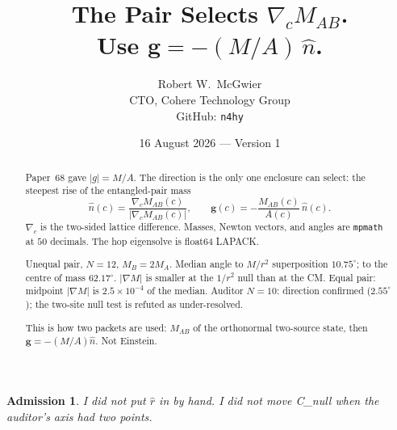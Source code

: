 \documentclass[11pt]{article}
\title{\textbf{The Pair Selects $\nabla_c M_{AB}$.\\
Use $\mathbf g=-(M/A)\,\hat n$.}}
\author{Robert W.\ McGwier\\
\small CTO, Cohere Technology Group\\
\small GitHub: \texttt{n4hy}}
\date{16 August 2026 --- Version 1}
\newtheorem*{admission}{Admission}
\begin{document}
\maketitle

\begin{abstract}
\noindent
Paper~68 gave $\lvert g\rvert=M/A$. The direction is
the only one enclosure can select: the steepest rise
of the entangled-pair mass
\[
\hat n(c)=\frac{\nabla_c M_{AB}(c)}{\lvert\nabla_c M_{AB}(c)\rvert},\qquad
\mathbf g(c)=-\frac{M_{AB}(c)}{A(c)}\,\hat n(c).
\]
$\nabla_c$ is the two-sided lattice difference.
Masses, Newton vectors, and angles are
\texttt{mpmath} at $50$ decimals. The hop
eigensolve is float64 LAPACK.

Unequal pair, $N=12$, $M_B=2M_A$.
Median angle to $M/r^2$ superposition $10.75^\circ$;
to the centre of mass $62.17^\circ$.
$\lvert\nabla M\rvert$ is smaller at the $1/r^2$ null
than at the CM. Equal pair: midpoint
$\lvert\nabla M\rvert$ is $2.5\times 10^{-4}$ of the
median. Auditor $N=10$: direction confirmed
($2.55^\circ$); the two-site null test is refuted
as under-resolved.

This is how two packets are used: $M_{AB}$ of the
orthonormal two-source state, then $\mathbf g=-(M/A)\hat n$.
Not Einstein.
\end{abstract}

\begin{admission}
I did not put $\hat r$ in by hand. I did not move
C\_null when the auditor's axis had two points.
\end{admission}
\end{document}
